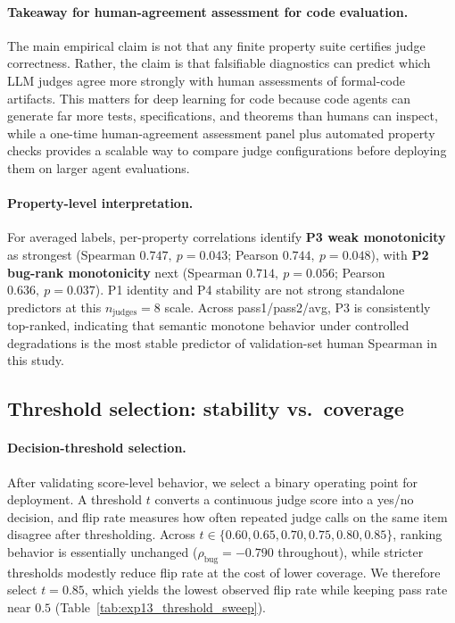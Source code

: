 \documentclass{article}
\begin{document}
\paragraph{Takeaway for human-agreement assessment for code evaluation.}
The main empirical claim is not that any finite property suite certifies judge correctness. Rather, the claim is that falsifiable diagnostics can predict which LLM judges agree more strongly with human assessments of formal-code artifacts. This matters for deep learning for code because code agents can generate far more tests, specifications, and theorems than humans can inspect, while a one-time human-agreement assessment panel plus automated property checks provides a scalable way to compare judge configurations before deploying them on larger agent evaluations.

\paragraph{Property-level interpretation.}
For averaged labels, per-property correlations identify
\textbf{P3 weak monotonicity} as strongest (Spearman \(0.747,\ p=0.043\); Pearson \(0.744,\ p=0.048\)),
with \textbf{P2 bug-rank monotonicity} next (Spearman \(0.714,\ p=0.056\); Pearson \(0.636,\ p=0.037\)).
P1 identity and P4 stability are not strong standalone predictors at this \(n_\text{judges}=8\) scale.
Across pass1/pass2/avg, P3 is consistently top-ranked, indicating that semantic monotone behavior under controlled degradations is the most stable predictor of validation-set human Spearman in this study.

\subsection{Threshold selection: stability vs.\ coverage}
\paragraph{Decision-threshold selection.}
After validating score-level behavior, we select a binary operating point for deployment. A threshold \(t\) converts a continuous judge score into a yes/no decision, and flip rate measures how often repeated judge calls on the same item disagree after thresholding. Across \(t\in\{0.60,0.65,0.70,0.75,0.80,0.85\}\), ranking behavior is essentially unchanged (\(\rho_{\text{bug}}=-0.790\) throughout), while stricter thresholds modestly reduce flip rate at the cost of lower coverage. We therefore select \(t=0.85\), which yields the lowest observed flip rate while keeping pass rate near \(0.5\) (Table~\ref{tab:exp13_threshold_sweep}).
\end{document}
